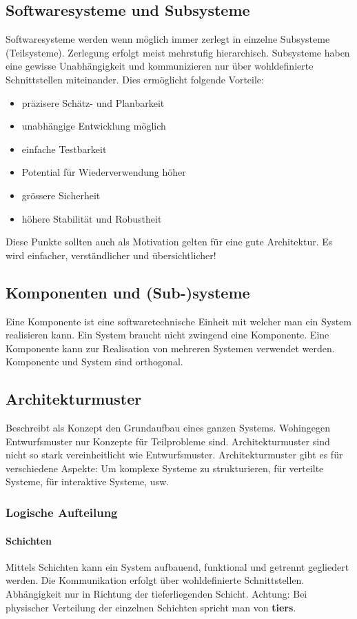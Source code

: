 \subsection{Softwaresysteme und Subsysteme}
Softwaresysteme werden wenn möglich immer zerlegt in einzelne Subsysteme (Teilsysteme). Zerlegung erfolgt meist mehrstufig hierarchisch. Subsysteme haben eine gewisse Unabhängigkeit und kommunizieren nur über wohldefinierte Schnittstellen miteinander. Dies ermöglicht folgende Vorteile:
\begin{itemize}
	\item präzisere Schätz- und Planbarkeit
	\item unabhängige Entwicklung möglich
	\item einfache Testbarkeit
	\item Potential für Wiederverwendung höher
	\item grössere Sicherheit
	\item höhere Stabilität und Robustheit
\end{itemize}
Diese Punkte sollten auch als Motivation gelten für eine gute Architektur. Es wird einfacher, verständlicher und übersichtlicher!

\subsection{Komponenten und (Sub-)systeme}
Eine Komponente ist eine softwaretechnische Einheit mit welcher man ein System realisieren kann. Ein System braucht nicht zwingend eine Komponente. Eine Komponente kann zur Realisation von mehreren Systemen verwendet werden. Komponente und System sind orthogonal.

\subsection{Architekturmuster}
Beschreibt als Konzept den Grundaufbau eines ganzen Systems. Wohingegen Entwurfsmuster nur Konzepte für Teilprobleme sind. Architekturmuster sind nicht so stark vereinheitlicht wie Entwurfsmuster. Architekturmuster gibt es für verschiedene Aspekte: Um komplexe Systeme zu strukturieren, für verteilte Systeme, für interaktive Systeme, usw.

\subsubsection{Logische Aufteilung}

\paragraph{Schichten} Mittels Schichten kann ein System aufbauend, funktional und getrennt gegliedert werden. Die Kommunikation erfolgt über wohldefinierte Schnittstellen. Abhängigkeit nur in Richtung der tieferliegenden Schicht. Achtung: Bei physischer Verteilung der einzelnen Schichten spricht man von \textbf{tiers}.

